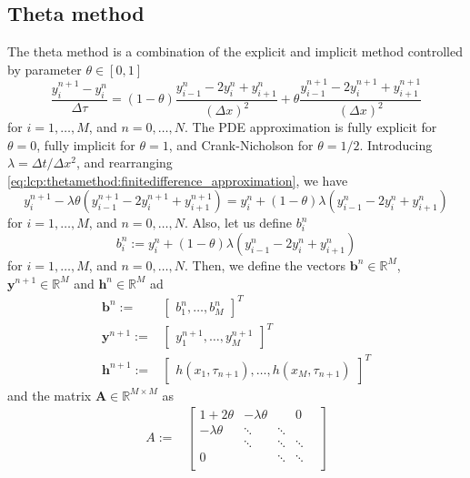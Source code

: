 \subsection{Theta method}
The theta method is a combination of the explicit and implicit method controlled by parameter $\theta\in[0,1]$
\begin{equation}
  \label{eq:lcp:thetamethod:finitedifference_approximation}
  \dfrac{y^{n+1}_{i} - y^{n}_{i}}{\Delta \tau} = (1-\theta)\dfrac{y^{n}_{i-1} - 2y^{n}_{i} + y^{n}_{i+1}}{(\Delta x)^2} +  \theta\dfrac{y^{n+1}_{i-1} - 2y^{n+1}_{i} + y^{n+1}_{i+1}}{(\Delta x)^2}
\end{equation}
for $i = 1,\dots,M$, and $n = 0,\dots,N$. The PDE approximation is fully explicit for $\theta = 0$, fully implicit for $\theta = 1$, and Crank-Nicholson for $\theta=1/2$. Introducing $\lambda = \Delta{t} / \Delta{x}^2$, and rearranging \eqref{eq:lcp:thetamethod:finitedifference_approximation}, we have
\begin{equation}
  \label{eq:lcp:thetamethod:finitedifference_approximation_2}
  y^{n+1}_{i} - \lambda\theta(y^{n+1}_{i-1} - 2y^{n+1}_{i} + y^{n+1}_{i+1}) =  y^{n}_{i} + (1-\theta)\lambda(y^{n}_{i-1} - 2y^{n}_{i} + y^{n}_{i+1})
\end{equation}
for $i = 1,\dots,M$, and $n = 0,\dots,N$. Also, let us define $b^n_i$
\begin{equation}
  b^{n}_i := y^{n}_{i} + (1-\theta)\lambda(y^{n}_{i-1} - 2y^{n}_{i} + y^{n}_{i+1})
\end{equation}
for $i = 1,\dots,M$, and $n = 0,\dots,N$. Then, we define the vectors $\mathbf{b}^n\in\mathbb{R}^{M}$, $\mathbf{y}^{n+1}\in\mathbb{R}^{M}$ and $\mathbf{h}^n\in\mathbb{R}^{M}$ ad
\begin{align}
  \mathbf{b}^{n} :=& \begin{bmatrix}
    b^{n}_1, \dots, b^{n}_{M}
  \end{bmatrix}^{T}\\
  \mathbf{y}^{n+1} :=& \begin{bmatrix}
    y^{n+1}_1, \dots, y^{n+1}_{M}
  \end{bmatrix}^{T}\\
  \mathbf{h}^{n+1} :=& \begin{bmatrix}
    h(x_1, \tau_{n+1}), \dots, h(x_M, \tau_{n+1})
  \end{bmatrix}^{T}
\end{align}
and the matrix $\mathbf{A}\in\mathbb{R}^{M \times M}$ as
\begin{align}
  A :=& \begin{bmatrix}
    1+2\theta & -\lambda\theta & & 0 \\ 
   -\lambda\theta & \ddots & \ddots \\
      & \ddots & \ddots & \ddots \\
    0 & & \ddots & \ddots & \\
  \end{bmatrix} 
\end{align}
